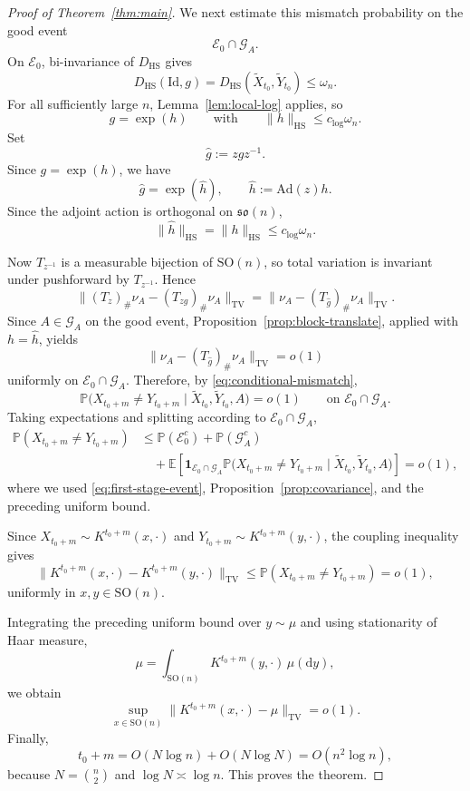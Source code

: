 \documentclass[11pt, reqno]{amsart}
\numberwithin{equation}{section}
\theoremstyle{remark}
\newcommand{\E}{\mathbb{E}}
\newcommand{\Prob}{\mathbb{P}}
\newcommand{\1}{\mathbf{1}}
\newcommand{\SO}{\mathrm{SO}}
\newcommand{\so}{\mathfrak{so}}
\newcommand{\Id}{\mathrm{Id}}
\newcommand{\HS}{\mathrm{HS}}
\newcommand{\TV}{\mathrm{TV}}
\newcommand{\Ad}{\mathrm{Ad}}
\newcommand{\dd}{\mathrm{d}}
\begin{document}
\begin{proof}[Proof of Theorem~\ref{thm:main}]
We next estimate this mismatch probability on the good event
\[
\mathcal E_0\cap \mathcal G_A.
\]
On \(\mathcal E_0\), bi-invariance of \(D_{\HS}\) gives
\[
D_{\HS}(\Id,g)
=
D_{\HS}(\widetilde X_{t_0},\widetilde Y_{t_0})
\le
\omega_n.
\]
For all sufficiently large \(n\), Lemma~\ref{lem:local-log} applies, so
\[
g=\exp(h)
\qquad\text{with}\qquad
\|h\|_{\HS}\le c_{\log}\omega_n.
\]
Set
\[
\widehat g:=zgz^{-1}.
\]
Since \(g=\exp(h)\), we have
\[
\widehat g=\exp(\widehat h),
\qquad
\widehat h:=\Ad(z)h.
\]
Since the adjoint action is orthogonal on \(\so(n)\),
\[
\|\widehat h\|_{\HS}=\|h\|_{\HS}\le c_{\log}\omega_n.
\]

Now \(T_{z^{-1}}\) is a measurable bijection of \(\SO(n)\), so total variation is
invariant under pushforward by \(T_{z^{-1}}\). Hence
\[
\|(T_z)_\#\nu_A-(T_{zg})_\#\nu_A\|_{\TV}
=
\|\nu_A-(T_{\widehat g})_\#\nu_A\|_{\TV}.
\]
Since \(A\in\mathcal G_A\) on the good event, Proposition~\ref{prop:block-translate},
applied with \(h=\widehat h\), yields
\[
\|\nu_A-(T_{\widehat g})_\#\nu_A\|_{\TV}=o(1)
\]
uniformly on \(\mathcal E_0\cap \mathcal G_A\). 
Therefore, by \eqref{eq:conditional-mismatch},
\[
\Prob\!\bigl(X_{t_0+m}\neq Y_{t_0+m}\mid \widetilde X_{t_0},\widetilde Y_{t_0},A\bigr)
=
o(1)
\qquad\text{on }\mathcal E_0\cap \mathcal G_A.
\]
Taking expectations and splitting according to \(\mathcal E_0\cap\mathcal G_A\),
\begin{align*}
\Prob(X_{t_0+m}\neq Y_{t_0+m})
&\le
\Prob(\mathcal E_0^c)+\Prob(\mathcal G_A^c) \\
&\quad+
\E\!\left[
\1_{\mathcal E_0\cap\mathcal G_A}
\Prob\!\bigl(X_{t_0+m}\neq Y_{t_0+m}\mid
\widetilde X_{t_0},\widetilde Y_{t_0},A\bigr)
\right]
=o(1),
\end{align*}
where we used \eqref{eq:first-stage-event}, Proposition~\ref{prop:covariance},
and the preceding uniform bound.

Since \(X_{t_0+m}\sim K^{t_0+m}(x,\cdot)\) and
\(Y_{t_0+m}\sim K^{t_0+m}(y,\cdot)\), the coupling inequality gives
\[
\|K^{t_0+m}(x,\cdot)-K^{t_0+m}(y,\cdot)\|_{\TV}
\le
\Prob(X_{t_0+m}\neq Y_{t_0+m})
=
o(1),
\]
uniformly in \(x,y\in\SO(n)\).

Integrating the preceding uniform bound over $y\sim\mu$ and using stationarity of Haar measure,
\[
\mu=\int_{\SO(n)}K^{t_0+m}(y,\cdot)\,\mu(\dd y),
\]
we obtain
\[
\sup_{x\in\SO(n)}
\|K^{t_0+m}(x,\cdot)-\mu\|_{\TV}
=
o(1).
\]
Finally,
\[
t_0+m
=
O(N\log n)+O(N\log N)
=
O(n^2\log n),
\]
because \(N=\binom n2\) and \(\log N\asymp \log n\). This proves the theorem.
\end{proof}
\end{document}
